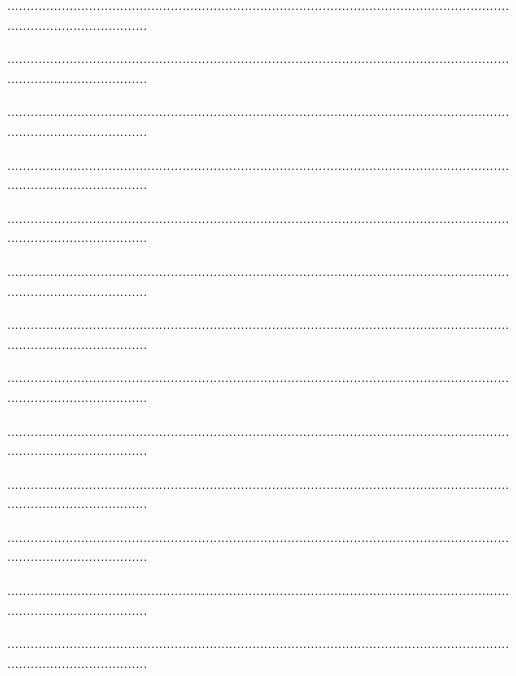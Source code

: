 \documentclass{article}
\begin{document}
.....................................................................................................................................................................

.....................................................................................................................................................................

.....................................................................................................................................................................

.....................................................................................................................................................................

.....................................................................................................................................................................

.....................................................................................................................................................................

.....................................................................................................................................................................

.....................................................................................................................................................................

.....................................................................................................................................................................

.....................................................................................................................................................................

.....................................................................................................................................................................

.....................................................................................................................................................................

.....................................................................................................................................................................
\end{document}
